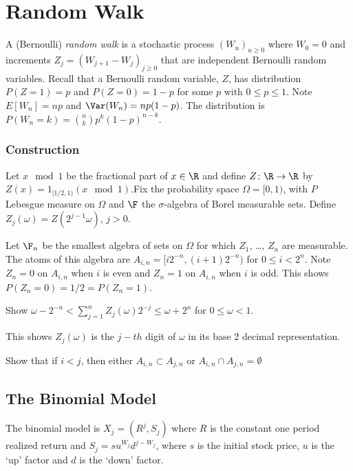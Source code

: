 \chapter{Random Walk}

A (Bernoulli) {\em random walk} is a stochastic process $(W_n)_{n\ge0}$
where $W_0 = 0$ and increments $Z_j = (W_{j + 1} - W_j)_{j\ge0}$ that are 
independent Bernoulli random variables. Recall that a Bernoulli random
variable, $Z$, has distribution $P(Z = 1) = p$ and $P(Z = 0) = 1 - p$
for some $p$ with $0\le p\le 1$.
Note $E[W_n] = np$ and $\Var(W_n) = np(1 - p)$.
The distribution is $P(W_n = k) = \binom{n}{k} p^k(1 - p)^{n - k}$.

\subsection{Construction}
Let $x\mod 1$ be the fractional part of $x\in\R$ and
define $Z\colon\R\to\R$ by $Z(x) = 1_{[1/2, 1)}(x\mod 1)$.Fix the probability
space $\Omega = [0,1)$, with $P$ Lebesgue measure on $\Omega$ and $\F$ the
$\sigma$-algebra of Borel measurable sets.
Define $Z_j(\omega) = Z(2^{j - 1}\omega)$, $j > 0$.

Let $\F_n$ be the smallest algebra of sets on $\Omega$ for which $Z_1$, \dots, $Z_n$ are
measurable. The atoms of this algebra are $A_{i,n} = [i2^{-n},(i + 1)2^{-n})$ for $0\le i < 2^n$.
Note $Z_n = 0$ on $A_{i,n}$ when $i$ is even and $Z_n = 1$ on $A_{i,n}$ when $i$ is odd. This shows
$P(Z_n = 0) = 1/2 = P(Z_n = 1)$.

\begin{exercise}
Show $\omega - 2^{-n} < \sum_{j = 1}^n Z_j(\omega) 2^{-j} \le \omega + 2^n$ for $0\le\omega<1$.
\end{exercise}

This shows $Z_j(\omega)$ is the $j-th$ digit of $\omega$ in its base 2 decimal representation.

\begin{exercise}
Show that if $i < j$, then either $A_{i,n}\subset A_{j,n}$ or
$A_{i,n}\cap A_{j,n} = \emptyset$
\end{exercise}

\section{The Binomial Model}
The binomial model is $X_j = (R^j, S_j)$ where $R$ is the constant
one period realized return and $S_j = su^{W_j}d^{j-W_j}$, where
$s$ is the initial stock price, $u$ is the `up' factor and
$d$ is the `down' factor.
